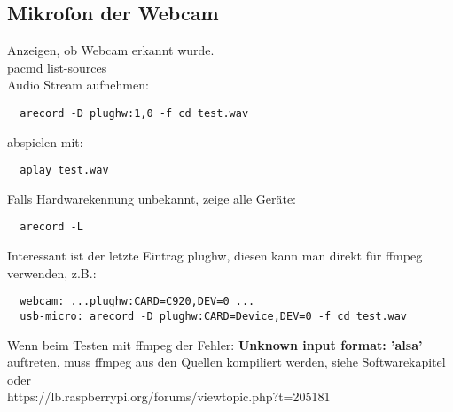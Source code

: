 \subsection{Mikrofon der Webcam}
Anzeigen, ob Webcam erkannt wurde.\\
pacmd list-sources\\ 

Audio Stream aufnehmen:
\begin{verbatim}
  arecord -D plughw:1,0 -f cd test.wav
\end{verbatim}
abspielen mit:
\begin{verbatim}
  aplay test.wav
\end{verbatim}

Falls Hardwarekennung unbekannt, zeige alle Geräte:
\begin{verbatim}
  arecord -L
\end{verbatim}
Interessant ist der letzte Eintrag plughw, diesen kann man direkt für
ffmpeg verwenden, z.B.:
\begin{verbatim}
  webcam: ...plughw:CARD=C920,DEV=0 ...
  usb-micro: arecord -D plughw:CARD=Device,DEV=0 -f cd test.wav
\end{verbatim}

Wenn beim Testen mit ffmpeg der Fehler: 
\textbf{Unknown input format: 'alsa'}\\ 
auftreten, muss ffmpeg aus den Quellen kompiliert werden, siehe 
Softwarekapitel oder\\ 
https://lb.raspberrypi.org/forums/viewtopic.php?t=205181

